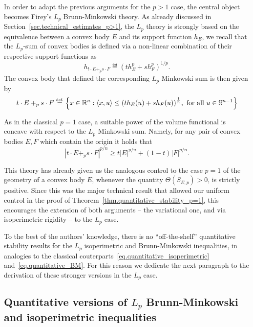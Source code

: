 \documentclass[a4paper, 10pt, twoside]{amsart}
\numberwithin{equation}{section}
\theoremstyle{plain}
\theoremstyle{definition}
\begin{document}
In order to adapt the previous arguments for the $p > 1$ case, the central object becomes Firey's $L_p$ Brunn-Minkowski theory. As already discussed in Section~\ref{sec.technical_estimates_p>1}, the $L_p$ theory is strongly based on the equivalence between a convex body $E$ and its support function $h_E$, we recall that the $L_p$-sum of convex bodies is defined via a non-linear combination of their respective support functions as
\begin{equation}
    h_{t\cdot E +_p s\cdot F} \eqdef 
    {\left(
        t h_E^p + s h_F^p
    \right)}^{1/p}.
\end{equation}
The convex body that defined the corresponding $L_p$ Minkowski sum is then given by 
\begin{equation}
    t\cdot E +_p s\cdot F
    \stackrel{\mbox{\upshape\tiny def.}}{=} 
    \left\{
        x \in \mathbb{R}^n: 
        \left\langle x,u\right\rangle
        \le 
        {\left( t h_E(u) + s h_F(u) \right)}^{\frac{1}{n}}, \text{ for all }
        u \in \mathbb{S}^{n-1}
    \right\}
\end{equation}

As in the classical $p=1$ case, a suitable power of the volume functional is concave with respect to the $L_p$ Minkowski sum. Namely, for any pair of convex bodies $E,F$ which contain the origin it holds that 
\begin{equation}\label{eq.LpBM_}
    {|t\cdot E +_p s \cdot F|}^{p/n} \ge 
    t{|E|}^{p/n} + (1-t){|F|}^{p/n}. 
\end{equation}

This theory has already given us the analogous control to the case $p = 1$ of the geometry of a convex body $E$, whenever the quantity $\Theta(S_{E,p})>0$, is strictly positive. Since this was the major technical result that allowed our uniform control in the proof of Theorem~\ref{thm.quantitative_stability_p=1}, this encourages the extension of both arguments -- the variational one, and via isoperimetric rigidity -- to the $L_p$ case.

To the best of the authors' knowledge, there is no ``off-the-shelf'' quantitative stability results for the $L_p$ isoperimetric and Brunn-Minkowski inequalities, in analogies to the classical couterparts~\eqref{eq.quantitative_isoperimetric} and~\eqref{eq.quantitative_BM}. For this reason we dedicate the next paragraph to the derivation of these stronger versions in the $L_p$ case.



\subsection{Quantitative versions of $L_p$ Brunn-Minkowski and isoperimetric inequalities}\label{sec.quantitativeLpBM_iso}
\end{document}
